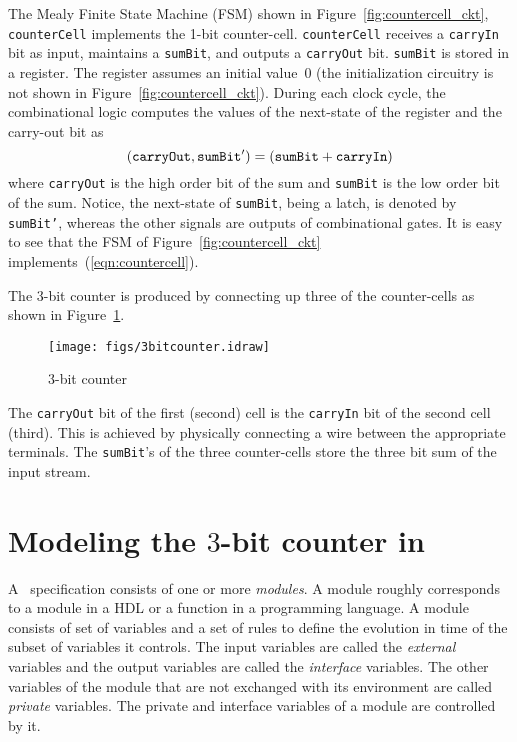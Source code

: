 The Mealy Finite State Machine (FSM)
shown in Figure~\ref{fig:countercell_ckt}, {\tt counterCell} implements the
1-bit counter-cell.  {\tt counterCell} receives a {\tt carryIn} bit as
input, maintains a {\tt sumBit}, and outputs a {\tt carryOut}
bit. {\tt sumBit} is
stored in a register. The register assumes an initial value~$0$ (the
initialization circuitry is not shown in Figure~\ref{fig:countercell_ckt}).
During each clock cycle, the combinational
logic computes the values of the next-state of the register and the
carry-out bit as 
\begin{equation}
\label{eqn:countercell}
{\tt (carryOut, sumBit') = (sumBit + carryIn) }
\end{equation}
where {\tt carryOut} is the high order bit of the sum and {\tt sumBit} is the low order
bit of the sum. Notice, the next-state of {\tt sumBit}, being a latch, is
denoted by {\tt sumBit'}, whereas the other signals are outputs of
combinational gates. It is easy to see that the FSM of Figure~\ref{fig:countercell_ckt}
implements~(\ref{eqn:countercell}). 

The 3-bit counter is produced by connecting up three of the
counter-cells as shown in Figure~\ref{fig:3bit_ckt}. 
\begin{figure}
\centerline{\texttt{[image: figs/3bitcounter.idraw]}}
\caption{$3$-bit counter}
\label{fig:3bit_ckt}
\end{figure}
The {\tt carryOut} bit of the first (second) cell is the {\tt carryIn} bit of the second
cell (third). This is achieved by physically connecting a wire between the
appropriate terminals.  The {\tt sumBit}'s of the three counter-cells
store the three bit sum of the input stream. 


\section{Modeling the $3$-bit counter in \rem}
A \rem\ specification consists of one or more {\em modules}. A module
roughly corresponds to a module in a HDL or a function in a
programming language. A module consists of set of variables and a set
of rules to define the evolution in time of the subset of variables it
controls. The input variables are called the {\em external} variables and
the output variables are called the {\em interface} variables.
The other variables of the module that are not exchanged with
its environment are called {\em private} variables. The private and
interface variables of a module are controlled by it. 

